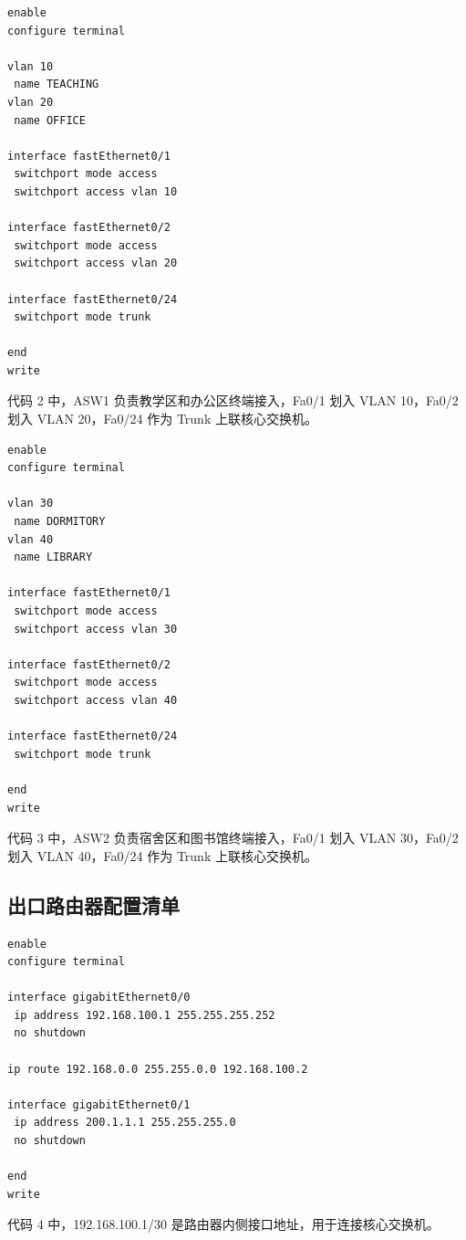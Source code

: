 \documentclass[UTF8,a4paper]{ctexart}
\begin{document}
\begin{lstlisting}[caption={ASW1 主要配置}]
enable
configure terminal

vlan 10
 name TEACHING
vlan 20
 name OFFICE

interface fastEthernet0/1
 switchport mode access
 switchport access vlan 10

interface fastEthernet0/2
 switchport mode access
 switchport access vlan 20

interface fastEthernet0/24
 switchport mode trunk

end
write
\end{lstlisting}

代码 2 中，ASW1 负责教学区和办公区终端接入，Fa0/1 划入 VLAN 10，Fa0/2 划入 VLAN 20，Fa0/24 作为 Trunk 上联核心交换机。

\begin{lstlisting}[caption={ASW2 主要配置}]
enable
configure terminal

vlan 30
 name DORMITORY
vlan 40
 name LIBRARY

interface fastEthernet0/1
 switchport mode access
 switchport access vlan 30

interface fastEthernet0/2
 switchport mode access
 switchport access vlan 40

interface fastEthernet0/24
 switchport mode trunk

end
write
\end{lstlisting}

代码 3 中，ASW2 负责宿舍区和图书馆终端接入，Fa0/1 划入 VLAN 30，Fa0/2 划入 VLAN 40，Fa0/24 作为 Trunk 上联核心交换机。

\subsection{出口路由器配置清单}

\begin{lstlisting}[caption={出口路由器主要配置}]
enable
configure terminal

interface gigabitEthernet0/0
 ip address 192.168.100.1 255.255.255.252
 no shutdown

ip route 192.168.0.0 255.255.0.0 192.168.100.2

interface gigabitEthernet0/1
 ip address 200.1.1.1 255.255.255.0
 no shutdown

end
write
\end{lstlisting}

代码 4 中，192.168.100.1/30 是路由器内侧接口地址，用于连接核心交换机。
\end{document}
